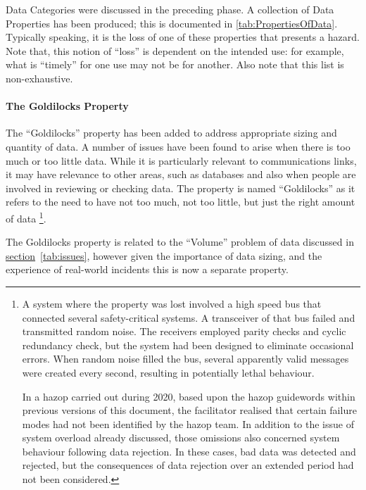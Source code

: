 Data Categories were discussed in the preceding phase. A collection of Data Properties has been produced; this is documented in \autoref{tab:PropertiesOfData}. Typically speaking, it is the loss of one of these properties that presents a hazard. Note that, this notion of ``loss'' is dependent on the intended use: for example, what is ``timely'' for one use may not be for another. Also note that this list is non-exhaustive.

\paragraph{The Goldilocks Property}\label{bkm:guidance:goldilocks}
The ``Goldilocks'' property has been added to address appropriate sizing and quantity of data. A number of issues have been found to arise when there is too much or too little data. While it is particularly relevant to communications links, it may have relevance to other areas, such as \glspl{database} and also when people are involved in reviewing or checking data. The property is named ``Goldilocks'' as it refers to the need to have not too much, not too little, but just the right amount of data%
%
\footnote{A system where the property was lost involved a high speed bus that connected several safety-critical systems. A transceiver of that bus failed and transmitted random noise. The receivers employed parity checks and cyclic redundancy check, but the system had been designed to eliminate occasional \cbstart\glspl{error}\cbend. When random noise filled the bus, several apparently valid messages were created every second, resulting in potentially lethal behaviour.

In a \gls{hazop} carried out during 2020, based upon the \gls{hazop} guidewords within previous versions of this document, the facilitator realised that certain failure modes had not been identified by the \gls{hazop} team. In addition to the issue of system overload already discussed, those omissions also concerned system behaviour following data rejection. In these cases, bad data was detected and rejected, but the consequences of data rejection over an extended period had not been considered.}.

The Goldilocks property is related to the ``Volume'' problem of data discussed in \hyperref[tab:issues]{section}~\ref{tab:issues}, however given the importance of data sizing, and the experience of real-world incidents this is now a separate property.
%
